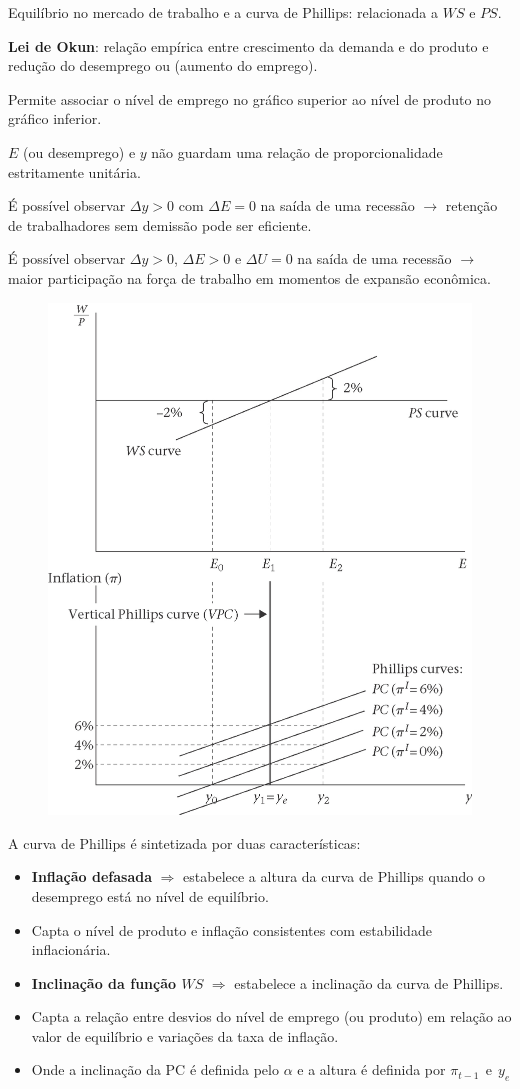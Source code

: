 \documentclass[a4paper,12pt]{article}[abntex2]
\begin{document}
Equilíbrio no mercado de trabalho e a curva de Phillips: relacionada a \( WS \) e \( PS \).

\textbf{Lei de Okun}: relação empírica entre crescimento da demanda e do produto e redução do desemprego ou (aumento do emprego).

Permite associar o nível de emprego no gráfico superior ao nível de produto no gráfico inferior.

\( E \) (ou desemprego) e \( y \) não guardam uma relação de proporcionalidade estritamente unitária.

É possível observar \( \Delta y > 0 \) com \( \Delta E = 0 \) na saída de uma recessão \(\rightarrow\) retenção de trabalhadores sem demissão pode ser eficiente.

É possível observar \( \Delta y > 0 \), \( \Delta E > 0 \) e \( \Delta U = 0 \) na saída de uma recessão \(\rightarrow\) maior participação na força de trabalho em momentos de expansão econômica.


\begin{figure}[H]
    \centering
    \includegraphics[width=0.7\linewidth]{Imagens/a9i2.png}
\end{figure}

A curva de Phillips é sintetizada por duas características:

\begin{itemize}
    \item \textbf{Inflação defasada} \(\Rightarrow\) estabelece a altura da curva de Phillips quando o desemprego está no nível de equilíbrio.
    \item  Capta o nível de produto e inflação consistentes com estabilidade inflacionária.
    \item \textbf{Inclinação da função \(WS\)} \(\Rightarrow\) estabelece a inclinação da curva de Phillips.
    \item Capta a relação entre desvios do nível de emprego (ou produto) em relação ao valor de equilíbrio e variações da taxa de inflação.
    \item Onde a inclinação da PC é definida pelo \(\alpha\) e a altura é definida por \(\pi_{t-1}\ \  \text{e}\ \ y_e \)
\end{itemize}
\end{document}
